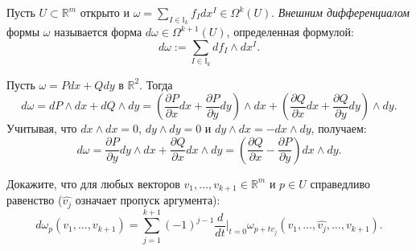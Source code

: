 \begin{definition}
	Пусть $U \subset \mathbb{R}^m$ открыто и $\omega = \sum_{I \in \mathbb{I}_k} f_I dx^I \in \Omega^k(U)$. 
	\textit{Внешним дифференциалом} формы $\omega$ называется форма $d\omega \in \Omega^{k+1}(U)$, определенная формулой:
	\[ d \omega := \sum_{I \in \mathbb{I}_k} df_I \wedge dx^I. \]
\end{definition}

\begin{example}
	Пусть $\omega = P dx + Q dy$ в $\mathbb{R}^2$. Тогда 
	\[ d \omega = dP \wedge dx + dQ \wedge dy = \left( \frac{\partial P}{\partial x} dx + \frac{\partial P}{\partial y} dy \right) \wedge dx + \left( \frac{\partial Q}{\partial x} dx + \frac{\partial Q}{\partial y} dy \right) \wedge dy. \]
	Учитывая, что $dx \wedge dx = 0$, $dy \wedge dy = 0$ и $dy \wedge dx = - dx \wedge dy$, получаем:
	\[ d\omega = \frac{\partial P}{\partial y} dy \wedge dx + \frac{\partial Q}{\partial x} dx \wedge dy = \left( \frac{\partial Q}{\partial x} - \frac{\partial P}{\partial y} \right) dx \wedge dy. \]
\end{example}

\begin{problem}
	Докажите, что для любых векторов $v_1, \dotsc, v_{k+1} \in \mathbb{R}^m$ и $p \in U$ справедливо равенство ($\widehat{v_j}$ означает пропуск аргумента):
	\[ d \omega_p (v_1, \dotsc, v_{k+1}) = \sum \limits_{j=1}^{k+1} (-1)^{j-1} \frac{d}{dt} \Big|_{t = 0} \omega_{p + tv_j} (v_1, \dotsc, \widehat{v_j}, \dotsc, v_{k+1}). \]
\end{problem}